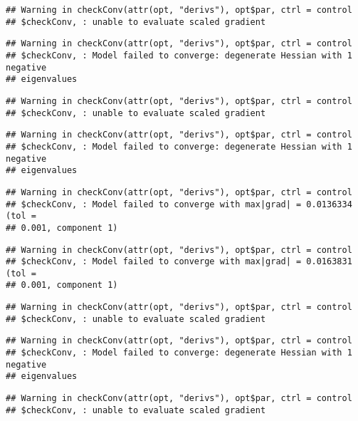 \documentclass[]{article}
\begin{document}
\begin{verbatim}
## Warning in checkConv(attr(opt, "derivs"), opt$par, ctrl = control
## $checkConv, : unable to evaluate scaled gradient
\end{verbatim}

\begin{verbatim}
## Warning in checkConv(attr(opt, "derivs"), opt$par, ctrl = control
## $checkConv, : Model failed to converge: degenerate Hessian with 1 negative
## eigenvalues
\end{verbatim}

\begin{verbatim}
## Warning in checkConv(attr(opt, "derivs"), opt$par, ctrl = control
## $checkConv, : unable to evaluate scaled gradient
\end{verbatim}

\begin{verbatim}
## Warning in checkConv(attr(opt, "derivs"), opt$par, ctrl = control
## $checkConv, : Model failed to converge: degenerate Hessian with 1 negative
## eigenvalues
\end{verbatim}

\begin{verbatim}
## Warning in checkConv(attr(opt, "derivs"), opt$par, ctrl = control
## $checkConv, : Model failed to converge with max|grad| = 0.0136334 (tol =
## 0.001, component 1)
\end{verbatim}

\begin{verbatim}
## Warning in checkConv(attr(opt, "derivs"), opt$par, ctrl = control
## $checkConv, : Model failed to converge with max|grad| = 0.0163831 (tol =
## 0.001, component 1)
\end{verbatim}

\begin{verbatim}
## Warning in checkConv(attr(opt, "derivs"), opt$par, ctrl = control
## $checkConv, : unable to evaluate scaled gradient
\end{verbatim}

\begin{verbatim}
## Warning in checkConv(attr(opt, "derivs"), opt$par, ctrl = control
## $checkConv, : Model failed to converge: degenerate Hessian with 1 negative
## eigenvalues
\end{verbatim}

\begin{verbatim}
## Warning in checkConv(attr(opt, "derivs"), opt$par, ctrl = control
## $checkConv, : unable to evaluate scaled gradient
\end{verbatim}
\end{document}
